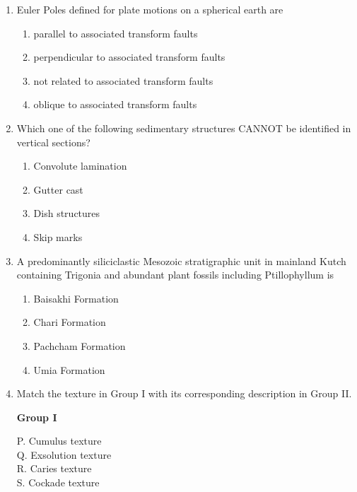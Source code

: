 \documentclass[journal,12pt,onecolumn]{IEEEtran}
\theoremstyle{remark}
\begin{document}
\begin{enumerate}
\item Euler Poles defined for plate motions on a spherical earth are  
\begin{enumerate}
\item parallel to associated transform faults  
\item perpendicular to associated transform faults  
\item not related to associated transform faults  
\item oblique to associated transform faults  
\end{enumerate}

\item Which one of the following sedimentary structures CANNOT be identified in vertical sections?  
\begin{multicols}{2}
\begin{enumerate}
\item Convolute lamination  
\item Gutter cast  
\item Dish structures  
\item Skip marks  
\end{enumerate}
\end{multicols}

\item A predominantly siliciclastic Mesozoic stratigraphic unit in mainland Kutch containing Trigonia and abundant plant fossils including Ptillophyllum is  
\begin{multicols}{2}
\begin{enumerate}
\item Baisakhi Formation  
\item Chari Formation  
\item Pachcham Formation  
\item Umia Formation  
\end{enumerate}
\end{multicols}

\item Match the texture in Group I with its corresponding description in Group II.

\begin{multicols}{2}
\textbf{Group I}  
\begin{flushleft}
P. Cumulus texture\\
Q. Exsolution texture\\
R. Caries texture\\
S. Cockade texture
\end{flushleft}


\end{multicols}
\end{enumerate}
\end{document}
